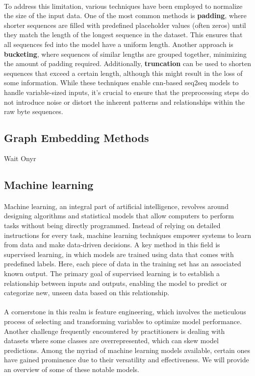         \paragraph{}To address this limitation, various techniques have been employed to normalize the size of the input data. One of the most common methods is \textbf{padding}, where shorter sequences are filled with predefined placeholder values (often zeros) until they match the length of the longest sequence in the dataset. This ensures that all sequences fed into the model have a uniform length. Another approach is \textbf{bucketing}, where sequences of similar lengths are grouped together, minimizing the amount of padding required. Additionally, \textbf{truncation} can be used to shorten sequences that exceed a certain length, although this might result in the loss of some information. While these techniques enable \acrshort{cnn}-based \acrfull{seq2seq} models to handle variable-sized inputs, it's crucial to ensure that the preprocessing steps do not introduce noise or distort the inherent patterns and relationships within the raw byte sequences.
\subsection{Graph Embedding Methods}
    Wait Onyr

\subsection{Machine learning}\label{seq:background:machine_learning}
    \paragraph{}Machine learning, an integral part of artificial intelligence, revolves around designing algorithms and statistical models that allow computers to perform tasks without being directly programmed. Instead of relying on detailed instructions for every task, machine learning techniques empower systems to learn from data and make data-driven decisions. A key method in this field is supervised learning, in which models are trained using data that comes with predefined labels. Here, each piece of data in the training set has an associated known output. The primary goal of supervised learning is to establish a relationship between inputs and outputs, enabling the model to predict or categorize new, unseen data based on this relationship.

    \paragraph{}A cornerstone in this realm is feature engineering, which involves the meticulous process of selecting and transforming variables to optimize model performance. Another challenge frequently encountered by practitioners is dealing with datasets where some classes are overrepresented, which can skew model predictions. Among the myriad of machine learning models available, certain ones have gained prominence due to their versatility and effectiveness. We will provide an overview of some of these notable models.

